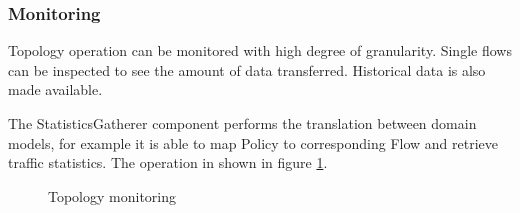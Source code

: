 \documentclass[11pt,openany]{book}
\begin{document}
        \subsubsection{Monitoring}

          Topology operation can be monitored with high degree of granularity. Single flows can be inspected to see the
          amount of data transferred. Historical data is also made available.

          The StatisticsGatherer component performs the translation between domain models, for example it is able to map
          Policy to corresponding Flow and retrieve traffic statistics. The operation in shown in figure
          \ref{fig:arch:seqmon}.

          \begin{figure}[H]
            \centering





            \caption{Topology monitoring}
            \label{fig:arch:seqmon}
          \end{figure}
\end{document}
